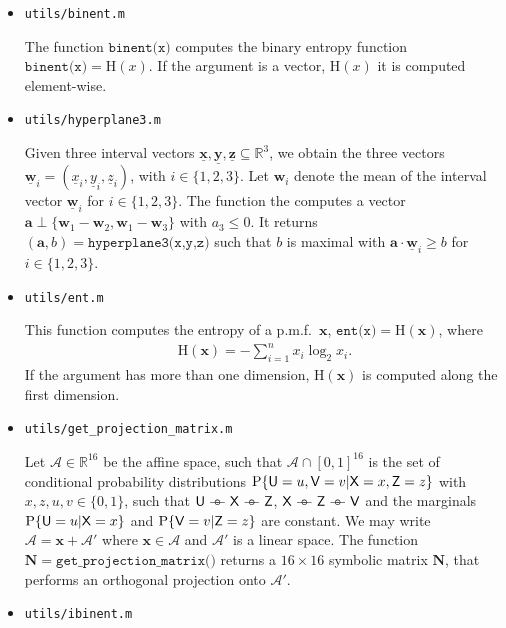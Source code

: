 \documentclass[a4paper,12pt]{scrartcl}
\newcommand{\Pcond}[2]{\ensuremath{\mathrm{P}}\{#1|#2\}}
\newcommand{\ul}[1]{\ensuremath{\underline{#1}}}
\newcommand{\mat}[1]{\ensuremath{\mathbf{#1}}}
\newcommand{\vt}[1]{\ensuremath{\mathbf{#1}}}
\newcommand{\rv}[1]{\ensuremath{\mathsf{\uppercase{#1}}}}
\newcommand{\AAA}{\ensuremath{\mathcal A}}
\newcommand{\RR}{\ensuremath{\mathbb R}}
\def\barcirc{\mathrel{\barcirci}}
\def\barcirci{{%
    \setbox0\hbox{\ensuremath{\relbar\!\!\relbar}}%
    \rlap{\hbox to \wd0{\hss\ensuremath{\circ}\hss}}\box0
}}
\newcommand{\mkv}{\ensuremath{\barcirc}}
\newcommand{\binEnt}[1]{\ensuremath{\mathrm{H}(#1)}}
\begin{document}
\begin{itemize}
\item \texttt{utils/binent.m}

  The function $\texttt{binent(x)}$ computes the binary entropy function $\texttt{binent(x)} = \binEnt{x}$. If the argument is a vector, $\binEnt{x}$ it is computed element-wise.

  
\item \texttt{utils/hyperplane3.m}

  Given three interval vectors $\ul{\vt x}, \ul{\vt y}, \ul{\vt z} \subseteq \RR^3$, we obtain the three vectors $\ul{\vt w}_i = (\ul{x}_i, \ul{y}_i, \ul{z}_i)$, with $i \in \{1,2,3\}$.
  Let $\vt w_i$ denote the mean of the interval vector $\ul{\vt w}_i$ for $i \in \{1,2,3\}$. The function the computes a vector $\vt a \perp \{\vt w_1 - \vt w_2, \vt w_1 - \vt w_3\}$ with $a_3 \le 0$. It returns $(\vt a, b) = \texttt{hyperplane3(x,y,z)}$ such that $b$ is maximal with $\vt a \cdot \ul{\vt w}_i \ge b$ for $i \in \{1,2,3\}$.
  
  
\item \texttt{utils/ent.m}

  This function computes the entropy of a p.m.f.\ $\vt x$, $\texttt{ent(x)} = \binEnt{\vt x}$, where
  \begin{align}
    \binEnt{\vt x} = - \sum_{i=1}^{n} x_i \log_2 x_i .
  \end{align}
  If the argument has more than one dimension, $\binEnt{\vt x}$ is computed along the first dimension.

  
\item \texttt{utils/get\_projection\_matrix.m}

  Let $\AAA \in \RR^{16}$ be the affine space, such that $\AAA \cap [0,1]^{16}$ is the set of conditional probability distributions $\Pcond{\rv u=u, \rv v=v}{\rv x=x, \rv z=z}$ with $x,z,u,v \in \{0,1\}$, such that $\rv u \mkv \rv x \mkv \rv z$, $\rv x \mkv \rv z \mkv \rv v$ and the marginals $\Pcond{\rv u=u}{\rv x=x}$ and $\Pcond{\rv v=v}{\rv z=z}$ are constant.
  We may write $\AAA = \vt x + \AAA'$ where $\vt x \in \AAA$ and $\AAA'$ is a linear space.
  The function $\mat N = \texttt{get\_projection\_matrix()}$ returns a $16 \times 16$ symbolic matrix $\mat N$, that performs an orthogonal projection onto $\AAA'$.
  
  
\item \texttt{utils/ibinent.m}


\end{itemize}
\end{document}
